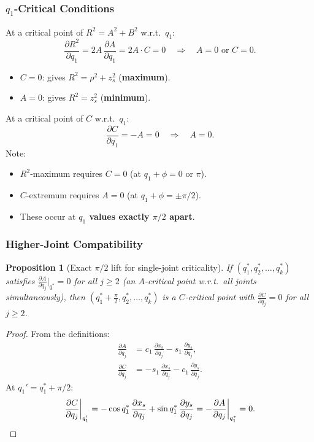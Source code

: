 \documentclass[11pt,a4paper]{article}
\newtheorem{proposition}[theorem]{Proposition}
\begin{document}
\subsubsection{$q_1$-Critical Conditions}

At a critical point of $R^2 = A^2 + B^2$ w.r.t.\ $q_1$:
\begin{equation}\label{eq:dR2_dq1}
  \frac{\partial R^2}{\partial q_1} = 2A\,\frac{\partial A}{\partial q_1}
  = 2A \cdot C = 0
  \quad \Longrightarrow \quad A = 0 \text{ or } C = 0.
\end{equation}
\begin{itemize}
  \item $C = 0$: gives $R^2 = \rho^2 + z_s^2$ (\textbf{maximum}).
  \item $A = 0$: gives $R^2 = z_s^2$ (\textbf{minimum}).
\end{itemize}

At a critical point of $C$ w.r.t.\ $q_1$:
\begin{equation}\label{eq:dC_dq1_crit}
  \frac{\partial C}{\partial q_1} = -A = 0
  \quad \Longrightarrow \quad A = 0.
\end{equation}
Note:
\begin{itemize}
  \item $R^2$-maximum requires $C = 0$ (at $q_1 + \phi = 0$ or $\pi$).
  \item $C$-extremum requires $A = 0$ (at $q_1 + \phi = \pm\pi/2$).
  \item These occur at \textbf{$q_1$ values exactly $\pi/2$ apart}.
\end{itemize}

\subsubsection{Higher-Joint Compatibility}

\begin{proposition}[Exact $\pi/2$ lift for single-joint criticality]\label{prop:q1_lift}
If $(q_1^*, q_2^*,\ldots,q_k^*)$ satisfies
$\frac{\partial A}{\partial q_j}\bigr|_{q^*} = 0$ for all $j \ge 2$
(an $A$-critical point w.r.t.\ all joints simultaneously), then
$(q_1^*+\tfrac\pi2, q_2^*,\ldots,q_k^*)$ is a $C$-critical point
with $\frac{\partial C}{\partial q_j} = 0$ for all $j \ge 2$.
\end{proposition}

\begin{proof}
From the definitions:
\begin{align*}
  \frac{\partial A}{\partial q_j}
  &= c_1\,\frac{\partial x_s}{\partial q_j}
   - s_1\,\frac{\partial y_s}{\partial q_j}, \\
  \frac{\partial C}{\partial q_j}
  &= -s_1\,\frac{\partial x_s}{\partial q_j}
   - c_1\,\frac{\partial y_s}{\partial q_j}.
\end{align*}
At $q_1' = q_1^* + \pi/2$:
\[
  \frac{\partial C}{\partial q_j}\biggr|_{q_1'}
  = -\cos q_1^*\,\frac{\partial x_s}{\partial q_j}
  +  \sin q_1^*\,\frac{\partial y_s}{\partial q_j}
  = -\frac{\partial A}{\partial q_j}\biggr|_{q_1^*} = 0. \qedhere
\]
\end{proof}
\end{document}
